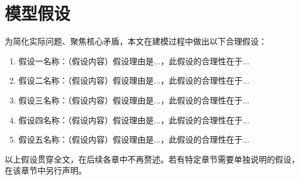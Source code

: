 \section{模型假设}

为简化实际问题、聚焦核心矛盾，本文在建模过程中做出以下合理假设：

\begin{enumerate}[label=(\arabic*)]
    \item {\heiti 假设一名称：}（假设内容）假设理由是...，此假设的合理性在于...
    \item {\heiti 假设二名称：}（假设内容）假设理由是...，此假设的合理性在于...
    \item {\heiti 假设三名称：}（假设内容）假设理由是...，此假设的合理性在于...
    \item {\heiti 假设四名称：}（假设内容）假设理由是...，此假设的合理性在于...
    \item {\heiti 假设五名称：}（假设内容）假设理由是...，此假设的合理性在于...
\end{enumerate}

以上假设贯穿全文，在后续各章中不再赘述。若有特定章节需要单独说明的假设，在该章节中另行声明。
